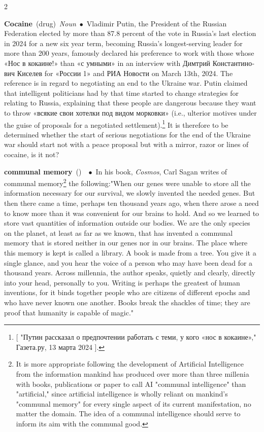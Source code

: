 \documentclass[10pt,a4paper,twoside]{article} %
\newcommand{\entry}[4]{\markboth{#1}{#1}\textbf{#1}\ {(#2)}\ \textit{#3}\ $\bullet$\ {#4}}  %
\begin{document}
\begin{multicols}{2}
\entry{Cocaine} {drug} {Noun} {Vladimir Putin, the President of the Russian Federation elected by more than 87.8 percent of the vote in Russia's last election in 2024 for a new six year term, becoming Russia's longest-serving leader for more than 200 years, famously declared his preference to work with those whose \textrussian{«Нос в кокаине!»} than \textrussian{«с умными»} in an interview with \textrussian{Димтрий Константинович Киселев} for \textrussian{«России 1»} and \textrussian{РИА Новости} on March 13th, 2024. The reference is in regard to negotiating an end to the Ukraine war. 
\newline \indent Putin claimed that intelligent politicians had by that time started to change strategies for relating to Russia, explaining that these people are dangerous because they want to throw \textrussian{«всякие свои хотелки под видом морковки»} (i.e., ulterior motives under the guise of proposals for a negotiated settlement).\footnote{ [ \textrussian{"Путин рассказал о предпочтении работать с теми, у кого «нос в кокаине»," Газета.ру,  13 марта 2024} ]. } It is therefore to be determined whether the start of serious negotiations for the end of the Ukraine war should start not with a peace proposal but with a mirror, razor or lines of cocaine, is it not? 
}

\entry{communal memory} {} {} {In his book, \emph{Cosmos}, Carl Sagan writes of communal memory\footnote{It is more appropriate following the development of Artificial Intelligence from the information mankind has produced over more than three millenia with books, publications or paper to call AI "communal intelligence" than "artificial," since artificial intelligence is wholly reliant on mankind's "communal memory" for every single aspect of its current manifestation, no matter the domain. The idea of a communal intelligence should serve to inform its aim with the communal good.} the following:"When our genes were unable to store all the information necessary for our survival, we slowly invented the needed genes. But then there came a time, perhaps ten thousand years ago, when there arose a need to know more than it was convenient for our brains to hold. And so we learned to store vast quantities of information outside our bodies. We are the only species on the planet, at least as far as we known, that has invented a communal memory that is stored neither in our genes nor in our brains. The place where this memory is kept is called a library. \newline \indent A book is made from a tree. You give it a single glance, and you hear the voice of a person who may have been dead for a thousand years. Across millennia, the author speaks, quietly and clearly, directly into your head, personally to you. Writing is perhaps the greatest of human inventions, for it binds together people  who are citizens of different epochs and who have never known one another. Books break the shackles of time; they are proof that humanity is capable of magic." } 


\end{multicols}
\end{document}
